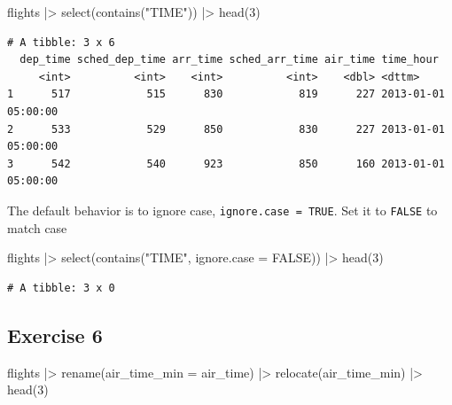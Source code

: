 \documentclass[
  letterpaper,
  DIV=11,
  numbers=noendperiod]{scrreprt}
\newenvironment{Shaded}{\begin{snugshade}}{\end{snugshade}}
\newcommand{\AttributeTok}[1]{\textcolor[rgb]{0.40,0.45,0.13}{#1}}
\newcommand{\ConstantTok}[1]{\textcolor[rgb]{0.56,0.35,0.01}{#1}}
\newcommand{\DecValTok}[1]{\textcolor[rgb]{0.68,0.00,0.00}{#1}}
\newcommand{\FunctionTok}[1]{\textcolor[rgb]{0.28,0.35,0.67}{#1}}
\newcommand{\NormalTok}[1]{\textcolor[rgb]{0.00,0.23,0.31}{#1}}
\newcommand{\SpecialCharTok}[1]{\textcolor[rgb]{0.37,0.37,0.37}{#1}}
\newcommand{\StringTok}[1]{\textcolor[rgb]{0.13,0.47,0.30}{#1}}
\begin{document}
\begin{Shaded}
\begin{Highlighting}[]
\NormalTok{flights }\SpecialCharTok{|\textgreater{}} 
  \FunctionTok{select}\NormalTok{(}\FunctionTok{contains}\NormalTok{(}\StringTok{"TIME"}\NormalTok{)) }\SpecialCharTok{|\textgreater{}}
  \FunctionTok{head}\NormalTok{(}\DecValTok{3}\NormalTok{)}
\end{Highlighting}
\end{Shaded}

\begin{verbatim}
# A tibble: 3 x 6
  dep_time sched_dep_time arr_time sched_arr_time air_time time_hour          
     <int>          <int>    <int>          <int>    <dbl> <dttm>             
1      517            515      830            819      227 2013-01-01 05:00:00
2      533            529      850            830      227 2013-01-01 05:00:00
3      542            540      923            850      160 2013-01-01 05:00:00
\end{verbatim}

The default behavior is to ignore case, \texttt{ignore.case\ =\ TRUE}.
Set it to \texttt{FALSE} to match case

\begin{Shaded}
\begin{Highlighting}[]
\NormalTok{flights }\SpecialCharTok{|\textgreater{}} 
  \FunctionTok{select}\NormalTok{(}\FunctionTok{contains}\NormalTok{(}\StringTok{"TIME"}\NormalTok{, }\AttributeTok{ignore.case =} \ConstantTok{FALSE}\NormalTok{)) }\SpecialCharTok{|\textgreater{}}
  \FunctionTok{head}\NormalTok{(}\DecValTok{3}\NormalTok{)}
\end{Highlighting}
\end{Shaded}

\begin{verbatim}
# A tibble: 3 x 0
\end{verbatim}

\subsection{Exercise 6}\label{exercise-6-3}

\begin{Shaded}
\begin{Highlighting}[]
\NormalTok{flights }\SpecialCharTok{|\textgreater{}} 
  \FunctionTok{rename}\NormalTok{(}\AttributeTok{air\_time\_min =}\NormalTok{ air\_time) }\SpecialCharTok{|\textgreater{}}
  \FunctionTok{relocate}\NormalTok{(air\_time\_min) }\SpecialCharTok{|\textgreater{}}
  \FunctionTok{head}\NormalTok{(}\DecValTok{3}\NormalTok{)}
\end{Highlighting}
\end{Shaded}
\end{document}
